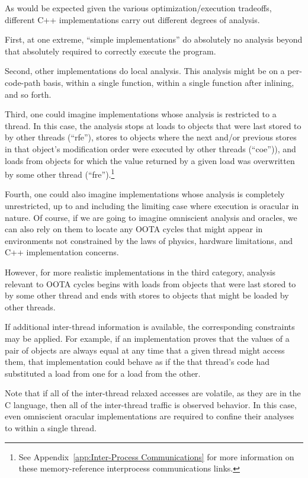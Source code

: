 \documentclass[10]{article}
\begin{document}
As would be expected given the various optimization/execution tradeoffs,
different C++ implementations carry out different degrees of analysis.

First, at one extreme, ``simple implementations'' do absolutely no
analysis beyond that absolutely required to correctly execute the program.

Second, other implementations do local analysis.
This analysis might be on a per-code-path basis, within a single function,
within a single function after inlining, and so forth.

Third, one could imagine implementations whose analysis is restricted to
a thread.
In this case, the analysis stops at loads to objects that were last
stored to by other threads (``rfe''), stores to objects where the next
and/or previous stores in that object's modification order were executed
by other threads (``coe'')), and loads from objects for which the value
returned by a given load was overwritten by some other thread
(``fre'').\footnote{
	See Appendix~\ref{app:Inter-Process Communications} for more
	information on these memory-reference interprocess communications
	links.}

Fourth, one could also imagine implementations whose analysis is
completely unrestricted, up to and including the limiting case where
execution is oracular in nature.
Of course, if we are going to imagine omniscient analysis and oracles,
we can also rely on them to locate any OOTA cycles that might appear
in environments not constrained by the laws of physics, hardware
limitations, and C++ implementation concerns.

However, for more realistic implementations in the third category,
analysis relevant to OOTA cycles begins with loads from objects that were
last stored to by some other thread and ends with stores to objects that
might be loaded by other threads.

If additional inter-thread information is available, the corresponding
constraints may be applied.
For example, if an implementation proves that the values of a pair of
objects are always equal at any time that a given thread might access
them, that implementation could behave as if the that thread's code had
substituted a load from one for a load from the other.

Note that if all of the inter-thread relaxed accesses are volatile,
as they are in the C language, then all of the inter-thread traffic is
observed behavior.
In this case, even omniscient oracular implementations are required
to confine their analyses to within a single thread.
\end{document}
